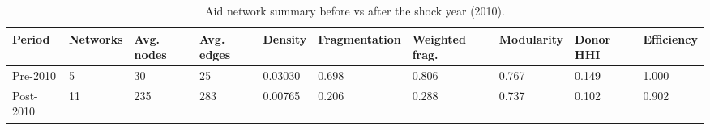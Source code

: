 \begin{table}[!ht]
\centering
\caption{Aid network summary before vs after the shock year (2010).}
\label{tab:aid_network_pre_post_shock}
\begin{tabular}{llllllllll}
\toprule
Period & Networks & Avg. nodes & Avg. edges & Density & Fragmentation & Weighted frag. & Modularity & Donor HHI & Efficiency\\
\midrule
Pre-2010 & 5 & 30 & 25 & 0.03030 & 0.698 & 0.806 & 0.767 & 0.149 & 1.000\\
Post-2010 & 11 & 235 & 283 & 0.00765 & 0.206 & 0.288 & 0.737 & 0.102 & 0.902\\
\bottomrule
\end{tabular}
\end{table}
